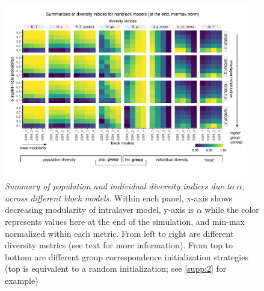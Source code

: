 \begin{figure}[H]
    \centering
    \includegraphics[width=0.95\textwidth,center]{../figures/report/Fig6.pdf}
    \caption{\label{fig:6}
    \textit{Summary  of  population  and  individual  diversity  indices  due  to $\alpha$,  across  different  block  models}. Within each panel, x-axis shows decreasing modularity of intralayer model, y-axis is $\alpha$ while the color represents values here at the end of the simulation, and min-max normalized within each metric. From left to right are different diversity metrics (see text for more information). From top to bottom are different group correspondence initialization strategies (top is equivalent to a random initialization; see \autoref{supp:2} for example)
    }
\end{figure}